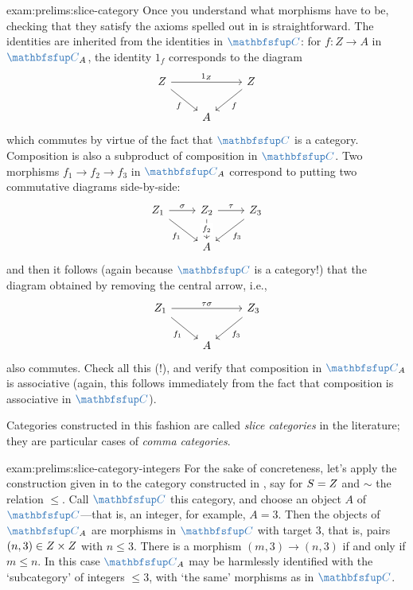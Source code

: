 \begin{exam}{}{exam:prelims:slice-category}
  Once you understand what morphisms have to be, checking that they
  satisfy the axioms spelled out in
   is
  straightforward. The identities are inherited from the identities in
  $\categ{C}$: for $f : Z \to A$ in $\categ{C}_A$, the identity $1_f$
  corresponds to the diagram
  \[
    \begin{tikzcd}
      Z \arrow[rr, "1_Z"] \arrow[dr, "f"'] & & Z \arrow[dl, "f"] \\
      & A &
    \end{tikzcd}
  \]
  which commutes by virtue of the fact that $\categ{C}$ is a category.
  Composition is also a subproduct of composition in $\categ{C}$. Two
  morphisms $f_1 \to f_2 \to f_3$ in $\categ{C}_A$ correspond to
  putting two commutative diagrams side-by-side:
  \[
    \begin{tikzcd}
      Z_1 \arrow[r, "\sigma"] \arrow[dr, "f_1"'] & Z_2 \arrow[r,
      "\tau"] \arrow[d, "f_2"' description] &
      Z_3 \arrow[dl, "f_3"] \\
      & A &
    \end{tikzcd}
  \]
  and then it follows (again because $\categ{C}$ is a category!) that
  the diagram obtained by removing the central arrow, i.e.,
  \[
    \begin{tikzcd}
      Z_1 \arrow[rr, "\tau\sigma"] \arrow[dr, "f_1"'] & & Z_3 \arrow[dl, "f_3"] \\
      & A &
    \end{tikzcd}
  \]
  also commutes. Check all this (!), and verify that composition in
  $\categ{C}_A$ is associative (again, this follows immediately from
  the fact that composition is associative in $\categ{C}$).

  Categories constructed in this fashion are called \emph{slice
    categories} in the literature; they are particular cases of
  \emph{comma categories}.
\end{exam}
\begin{exam}{}{exam:prelims:slice-category-integers}
  For the sake of concreteness, let's apply the construction given in
   to the category constructed in
  , say for $S = Z$ and $\sim$ the
  relation $\leq$. Call $\categ{C}$ this category, and choose an
  object $A$ of $\categ{C}$---that is, an integer, for example,
  $A = 3$. Then the objects of $\categ{C}_A$ are morphisms in
  $\categ{C}$ with target $3$, that is, pairs
  $(n, 3) \in Z \times Z$ with $n \leq 3$. There is a morphism
  $(m, 3) \to (n, 3)$ if and only if $m \leq n$. In this case
  $\categ{C}_A$ may be harmlessly identified with the `subcategory' of
  integers $\leq 3$, with `the same' morphisms as in $\categ{C}$.
\end{exam}

